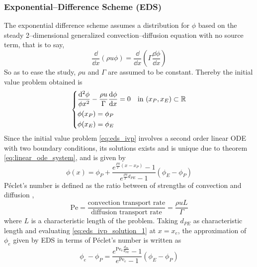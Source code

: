 \subsubsection{Exponential--Difference Scheme (EDS)}

The exponential difference scheme assumes a distribution for $\phi$ based on the
steady 2--dimensional generalized convection--diffusion equation with no source
term, that is to say,
\begin{equation}
	\frac{\dd}{\dd{x}} (\rho u \phi) = \frac{\dd}{\dd{x}} \left( \Gamma \frac{\dd{\phi}}{\dd{x}} \right)
\end{equation}
So as to ease the
study, $\rho u$ and $\Gamma$ are assumed to be constant. Thereby the initial
value problem obtained is
\begin{equation} \label{eq:eds_ivp}
	\left\{
	\begin{aligned}
		&\frac{\dd^2 \phi}{\phi{x^2}} - \frac{\rho u}{\Gamma} \frac{\dd{\phi}}{\dd{x}} = 0 & &\text{in } (x_P, x_E) \subset \mathbb{R} \\
		&\phi(x_P) = \phi_P \\
		&\phi(x_E) = \phi_E \\
	\end{aligned}
	\right.
\end{equation}
Since the initial value problem \eqref{eq:eds_ivp} involves a second order
linear ODE with two boundary conditions, its solutions exists and is unique due
to theorem \ref{eq:linear_ode_system}, and is given by
\begin{equation} \label{eq:eds_ivp_solution_1}
	\phi(x) = 
	\phi_P +
	\frac{e^{\frac{\rho u}{\Gamma} (x - x_P)} - 1}{e^{\frac{\rho u}{\Gamma} d_{PE}} - 1} (\phi_E - \phi_P)
\end{equation}
Péclet's number is defined as the ratio between of strengths of convection
and diffusion \cite{patankar2008numerical},
\begin{equation}
	\mathrm{Pe} = 
	\frac{\text{convection transport rate}}{\text{diffusion transport rate}} = 
	\frac{\rho u L}{\Gamma}
\end{equation}
where $L$ is a characteristic length of the problem. Taking $d_{PE}$ as characteristic length and evaluating
\eqref{eq:eds_ivp_solution_1} at $x = x_e$, the approximation of $\phi_e$ given
by EDS in terms of Péclet's number is written as
\begin{equation} \label{eq:eds_e}
	\phi_e - \phi_P = 
	\frac{e^{\mathrm{Pe}_e \frac{d_{Pe}}{d_{PE}}} - 1}{e^{\mathrm{Pe}_e} - 1} (\phi_E - \phi_P)
\end{equation}
